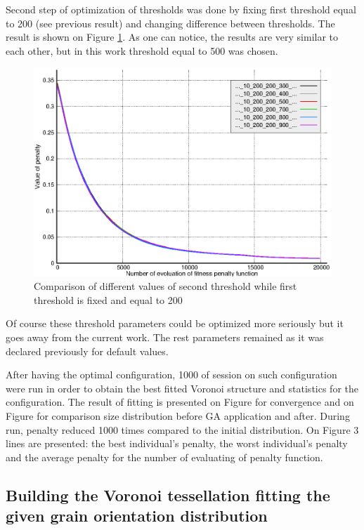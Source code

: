 \documentclass[12pt]{report}
\begin{document}
Second step of optimization of thresholds was done by fixing first threshold equal to 200 (see previous result) and changing difference between thresholds. The result is shown on Figure \ref{threshold2comparison}. As one can notice, the results are very similar to each other, but in this work threshold equal to 500 was chosen.

\begin{figure}
    \centering
    \includegraphics[width=5.0in]{threshold2_comparison}
    \caption{Comparison of different values of second threshold while first threshold is fixed and equal to 200}
    \label{threshold2comparison}
\end{figure}

Of course these threshold parameters could be optimized more seriously but it goes away from the current work. The rest parameters remained as it was declared previously for default values.

After having the optimal configuration, 1000 of session on such configuration were run in order to obtain the best fitted Voronoi structure and statistics for the configuration. The result of fitting is presented on Figure for convergence and on Figure for comparison size distribution before GA application and after. During run, penalty reduced 1000 times compared to the initial distribution.
On Figure 3 lines are presented: the best individual's penalty, the worst individual's penalty and the average penalty for the number of evaluating of penalty function.


\subsection{Building the Voronoi tessellation fitting the given grain orientation distribution}
\end{document}
